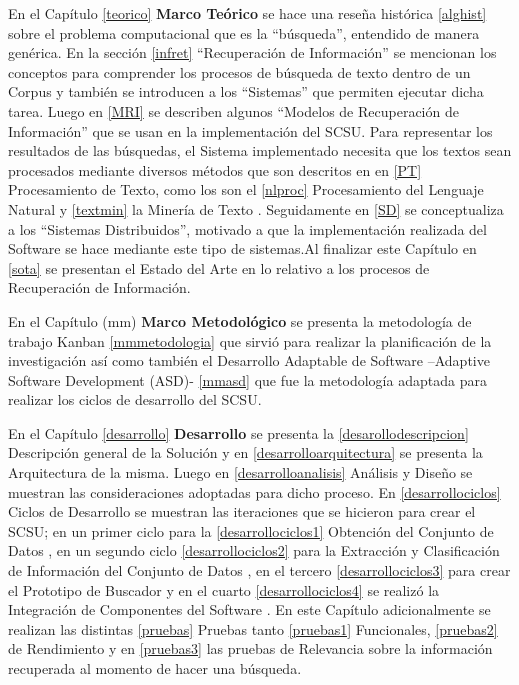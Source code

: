 \documentclass[
  10,
  openany]{book}
\begin{document}
En el Capítulo \ref{teorico} \textbf{Marco Teórico} se hace una reseña histórica \ref{alghist} sobre el problema computacional que es la ``búsqueda'', entendido de manera genérica. En la sección \ref{infret} ``Recuperación de Información'' se mencionan los conceptos para comprender los procesos de búsqueda de texto dentro de un Corpus y también se introducen a los ``Sistemas'' que permiten ejecutar dicha tarea. Luego en \ref{MRI} se describen algunos ``Modelos de Recuperación de Información'' que se usan en la implementación del SCSU. Para representar los resultados de las búsquedas, el Sistema implementado necesita que los textos sean procesados mediante diversos métodos que son descritos en en \ref{PT} Procesamiento de Texto, como los son el \ref{nlproc} Procesamiento del Lenguaje Natural y \ref{textmin} la Minería de Texto . Seguidamente en \ref{SD} se conceptualiza a los ``Sistemas Distribuidos'', motivado a que la implementación realizada del Software se hace mediante este tipo de sistemas.Al finalizar este Capítulo en \ref{sota} se presentan el Estado del Arte en lo relativo a los procesos de Recuperación de Información.

En el Capítulo \citet{ref}(mm) \textbf{Marco Metodológico} se presenta la metodología de trabajo Kanban \ref{mmmetodologia} que sirvió para realizar la planificación de la investigación así como también el Desarrollo Adaptable de Software --Adaptive Software Development (ASD)- \ref{mmasd} que fue la metodología adaptada para realizar los ciclos de desarrollo del SCSU.

En el Capítulo \ref{desarrollo} \textbf{Desarrollo} se presenta la \ref{desarollodescripcion} Descripción general de la Solución y en \ref{desarrolloarquitectura} se presenta la Arquitectura de la misma. Luego en \ref{desarrolloanalisis} Análisis y Diseño se muestran las consideraciones adoptadas para dicho proceso. En \ref{desarrollociclos} Ciclos de Desarrollo se muestran las iteraciones que se hicieron para crear el SCSU; en un primer ciclo para la \ref{desarrollociclos1} Obtención del Conjunto de Datos , en un segundo ciclo \ref{desarrollociclos2} para la Extracción y Clasificación de Información del Conjunto de Datos , en el tercero \ref{desarrollociclos3} para crear el Prototipo de Buscador y en el cuarto \ref{desarrollociclos4} se realizó la Integración de Componentes del Software . En este Capítulo adicionalmente se realizan las distintas \ref{pruebas} Pruebas tanto \ref{pruebas1} Funcionales, \ref{pruebas2} de Rendimiento y en \ref{pruebas3} las pruebas de Relevancia sobre la información recuperada al momento de hacer una búsqueda.
\end{document}
